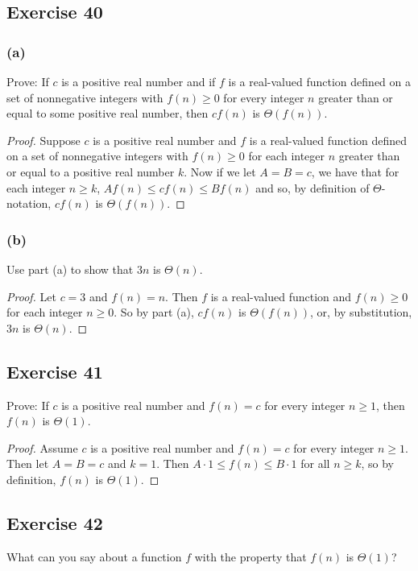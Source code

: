 \documentclass[14pt]{extarticle}
\begin{document}
\subsection{Exercise 40}
\subsubsection{(a)}
Prove: If \(c\) is a positive real number and if \(f\) is a real-valued function defined on a set of nonnegative integers
with \(f(n) \geq 0\) for every integer \(n\) greater than or equal to some positive real number, then \(cf(n)\) is
\(\Theta(f(n))\).

\begin{proof}
    Suppose \(c\) is a positive real number and \(f\) is a real-valued function defined on a set of nonnegative integers with
    \(f(n) \geq 0\) for each integer \(n\) greater than or equal to a positive real number \(k\). Now if we let \(A = B = c\),
    we have that for each integer \(n \geq k\), \(Af(n) \leq cf(n) \leq Bf(n)\) and so, by definition of \(\Theta\)-notation,
    \(cf(n)\) is \(\Theta(f(n))\).
\end{proof}

\subsubsection{(b)}
Use part (a) to show that \(3n\) is \(\Theta(n)\).
\begin{proof}
    Let \(c = 3\) and \(f(n) = n\). Then \(f\) is a real-valued function and \(f(n) \geq 0\) for each integer \(n \geq 0\). So
    by part (a), \(cf(n)\) is \(\Theta(f(n))\), or, by substitution, \(3n\) is \(\Theta(n)\).
\end{proof}

\subsection{Exercise 41}
Prove: If \(c\) is a positive real number and \(f(n) = c\) for every integer \(n \geq 1\), then \(f(n)\) is \(\Theta(1)\).

\begin{proof}
    Assume \(c\) is a positive real number and \(f(n) = c\) for every integer \(n \geq 1\). Then let \(A = B= c\) and \(k=1\).
    Then \(A \cdot 1 \leq f(n) \leq B \cdot 1\) for all \(n \geq k\), so by definition, \(f(n)\) is \(\Theta(1)\).
\end{proof}

\subsection{Exercise 42}
What can you say about a function \(f\) with the property that \(f(n)\) is \(\Theta(1)\)?
\end{document}
